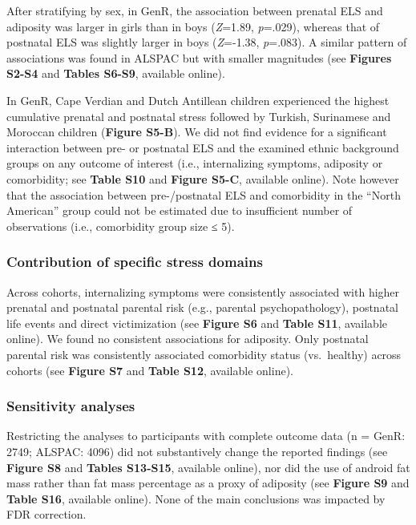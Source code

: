 \documentclass[
  letterpaper,
  DIV=11,
  numbers=noendperiod]{scrreport}
\begin{document}
After stratifying by sex, in GenR, the association between prenatal ELS
and adiposity was larger in girls than in boys (\emph{Z}=1.89,
\emph{p}=.029), whereas that of postnatal ELS was slightly larger in
boys (\emph{Z}=-1.38, \emph{p}=.083). A similar pattern of associations
was found in ALSPAC but with smaller magnitudes (see \textbf{Figures
S2-S4} and \textbf{Tables S6-S9}, available online).

In GenR, Cape Verdian and Dutch Antillean children experienced the
highest cumulative prenatal and postnatal stress followed by Turkish,
Surinamese and Moroccan children (\textbf{Figure S5-B}). We did not find
evidence for a significant interaction between pre- or postnatal ELS and
the examined ethnic background groups on any outcome of interest (i.e.,
internalizing symptoms, adiposity or comorbidity; see \textbf{Table S10}
and \textbf{Figure S5-C}, available online). Note however that the
association between pre-/postnatal ELS and comorbidity in the ``North
American'' group could not be estimated due to insufficient number of
observations (i.e., comorbidity group size ≤ 5).

\subsubsection{Contribution of specific stress
domains}\label{contribution-of-specific-stress-domains}

Across cohorts, internalizing symptoms were consistently associated with
higher prenatal and postnatal parental risk (e.g., parental
psychopathology), postnatal life events and direct victimization (see
\textbf{Figure S6} and \textbf{Table S11}, available online). We found
no consistent associations for adiposity. Only postnatal parental risk
was consistently associated comorbidity status (vs.~healthy) across
cohorts (see \textbf{Figure S7} and \textbf{Table S12}, available
online).

\subsubsection{Sensitivity analyses}\label{sensitivity-analyses}

Restricting the analyses to participants with complete outcome data (n =
GenR: 2749; ALSPAC: 4096) did not substantively change the reported
findings (see \textbf{Figure S8} and \textbf{Tables S13-S15}, available
online), nor did the use of android fat mass rather than fat mass
percentage as a proxy of adiposity (see \textbf{Figure S9} and
\textbf{Table S16}, available online). None of the main conclusions was
impacted by FDR correction.
\end{document}
